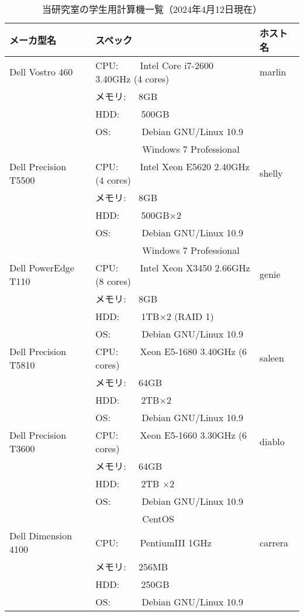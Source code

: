 \documentclass[main]{subfiles}
\begin{document}
\begin{table}[p]
    \fontsize{9}{9}
    \caption{当研究室の学生用計算機一覧（2024年4月12日現在）}
    \begin{center}
    \begin{tabular}{|l|l|l|}
    \hline
    メーカ型名 & スペック & ホスト名 \\
    \hline
    Dell Vostro 460 
     & CPU: 　　Intel Core i7-2600 3.40GHz (4 cores) & marlin \\
     & メモリ: 　8GB & \\
     & HDD: 　　500GB & \\
     & OS:  　　　Debian GNU/Linux 10.9 & \\
     &   　　　　　Windows 7 Professional & \\
    \hline
    Dell Precision T5500 
     & CPU: 　　Intel Xeon E5620 2.40GHz (4 cores) & shelly \\
     & メモリ: 　8GB & \\
     & HDD: 　　500GB×2 & \\
     & OS:  　　　Debian GNU/Linux 10.9 & \\
     &   　　　　　Windows 7 Professional & \\
    \hline
    Dell PowerEdge T110 
     & CPU: 　　Intel Xeon X3450 2.66GHz (8 cores) & genie \\
     & メモリ: 　8GB & \\
     & HDD: 　　1TB×2 (RAID 1) & \\
     & OS: 　　　Debian GNU/Linux 10.9 & \\
    \hline
    Dell Precision T5810 
     & CPU: 　　Xeon E5-1680 3.40GHz (6 cores) & saleen \\
     & メモリ: 　64GB & \\
     & HDD: 　　2TB×2 & \\
     & OS: 　　　Debian GNU/Linux 10.9 & \\
    \hline
    Dell Precision T3600 
     & CPU: 　　Xeon E5-1660 3.30GHz (6 cores) & diablo \\
     & メモリ: 　64GB & \\
     & HDD: 　　2TB ×2 & \\
     & OS: 　　　Debian GNU/Linux 10.9 & \\
     &     　　　　　CentOS & \\
    \hline
    Dell Dimension 4100 
     & CPU: 　　PentiumIII 1GHz & carrera \\
     & メモリ: 　256MB & \\
     & HDD: 　　250GB & \\
     & OS: 　　　Debian GNU/Linux 10.9 & \\
    \hline
    \end{tabular}
    \end{center}
\end{table}
\end{document}
